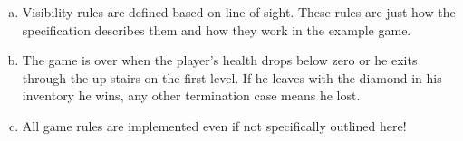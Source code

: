 \documentclass[a4paper,12pt]{article}
\begin{document}
\begin{enumerate} [a)]
  \item Visibility rules are defined based on line of sight. These
    rules are just how the specification describes them and how they
    work in the example game.

  \item The game is over when the player's health drops below zero or
    he exits through the up-stairs on the first level. If he leaves
    with the diamond in his inventory he wins, any other termination
    case means he lost.

  \item All game rules are implemented even if not specifically
    outlined here!
    
\end{enumerate}
\end{document}
